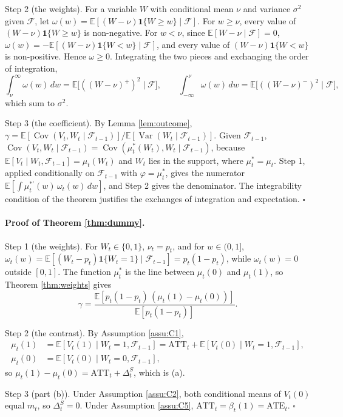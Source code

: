 \documentclass[12pt,a4paper]{article}
\theoremstyle{definition}
\newcommand{\E}{\mathbb{E}}
\newcommand{\cov}{\operatorname{Cov}}
\newcommand{\var}{\operatorname{Var}}
\begin{document}
Step 2 (the weights). For a variable $W$ with conditional mean $\nu$ and variance $\sigma^2$ given $\mathcal{F}$, let $\omega(w)=\E[(W-\nu)\mathbf{1}\{W\geq w\}\mid\mathcal{F}]$. For $w\geq\nu$, every value of $(W-\nu)\mathbf{1}\{W\geq w\}$ is non-negative. For $w<\nu$, since $\E[W-\nu\mid\mathcal{F}]=0$, $\omega(w)=-\E[(W-\nu)\mathbf{1}\{W<w\}\mid\mathcal{F}]$, and every value of $(W-\nu)\mathbf{1}\{W<w\}$ is non-positive. Hence $\omega\geq0$. Integrating the two pieces and exchanging the order of integration,
\[
\int_\nu^\infty\omega(w)\,dw=\E\big[((W-\nu)^+)^2\mid\mathcal{F}\big],\qquad \int_{-\infty}^\nu\omega(w)\,dw=\E\big[((W-\nu)^-)^2\mid\mathcal{F}\big],
\]
which sum to $\sigma^2$.

Step 3 (the coefficient). By Lemma \ref{lem:outcome}, $\gamma=\E[\cov(V_t,W_t\mid\mathcal{F}_{t-1})]/\E[\var(W_t\mid\mathcal{F}_{t-1})]$. Given $\mathcal{F}_{t-1}$, $\cov(V_t,W_t\mid\mathcal{F}_{t-1})=\cov(\mu_t^\ast(W_t),W_t\mid\mathcal{F}_{t-1})$, because $\E[V_t\mid W_t,\mathcal{F}_{t-1}]=\mu_t(W_t)$ and $W_t$ lies in the support, where $\mu_t^\ast=\mu_t$. Step 1, applied conditionally on $\mathcal{F}_{t-1}$ with $\varphi=\mu_t^\ast$, gives the numerator $\E[\int\mu_t^{\ast\prime}(w)\,\omega_t(w)\,dw]$, and Step 2 gives the denominator. The integrability condition of the theorem justifies the exchanges of integration and expectation. $\square$

\paragraph{Proof of Theorem \ref{thm:dummy}.} Step 1 (the weights). For $W_t\in\{0,1\}$, $\nu_t=p_t$, and for $w\in(0,1]$, $\omega_t(w)=\E[(W_t-p_t)\mathbf{1}\{W_t=1\}\mid\mathcal{F}_{t-1}]=p_t(1-p_t)$, while $\omega_t(w)=0$ outside $[0,1]$. The function $\mu_t^\ast$ is the line between $\mu_t(0)$ and $\mu_t(1)$, so Theorem \ref{thm:weights} gives
\[
\gamma=\frac{\E[p_t(1-p_t)\,(\mu_t(1)-\mu_t(0))]}{\E[p_t(1-p_t)]} .
\]

Step 2 (the contrast). By Assumption \ref{assu:C1},
\[
\begin{aligned}
\mu_t(1)&=\E[V_t(1)\mid W_t=1,\mathcal{F}_{t-1}]=\mathrm{ATT}_t+\E[V_t(0)\mid W_t=1,\mathcal{F}_{t-1}],\\
\mu_t(0)&=\E[V_t(0)\mid W_t=0,\mathcal{F}_{t-1}],
\end{aligned}
\]
so $\mu_t(1)-\mu_t(0)=\mathrm{ATT}_t+\Delta_t^S$, which is (a).

Step 3 (part (b)). Under Assumption \ref{assu:C2}, both conditional means of $V_t(0)$ equal $m_t$, so $\Delta_t^S=0$. Under Assumption \ref{assu:C5}, $\mathrm{ATT}_t=\beta_t(1)=\mathrm{ATE}_t$. $\square$
\end{document}
